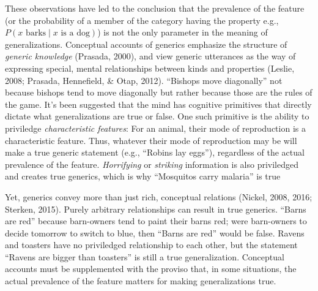 \documentclass[english,floatsintext,man]{apa6}
\theoremstyle{definition}
\theoremstyle{definition}
\theoremstyle{definition}
\theoremstyle{remark}
\begin{document}
These observations have led to the conclusion that the prevalence of the
feature (or the probability of a member of the category having the
property e.g., \(P(x \text{ barks} \mid x \text{ is a dog})\)) is not
the only parameter in the meaning of generalizations. Conceptual
accounts of generics emphasize the structure of \emph{generic knowledge}
(Prasada, 2000), and view generic utterances as the way of expressing
special, mental relationships between kinds and properties (Leslie,
2008; Prasada, Hennefield, \& Otap, 2012). \enquote{Bishops move
diagonally} not because bishops tend to move diagonally but rather
because those are the rules of the game. It's been suggested that the
mind has cognitive primitives that directly dictate what generalizations
are true or false. One such primitive is the ability to priviledge
\emph{characteristic features}: For an animal, their mode of
reproduction is a characteristic feature. Thus, whatever their mode of
reproduction may be will make a true generic statement (e.g.,
\enquote{Robins lay eggs}), regardless of the actual prevalence of the
feature. \emph{Horrifying} or \emph{striking} information is also
priviledged and creates true generics, which is why \enquote{Mosquitos
carry malaria} is true

Yet, generics convey more than just rich, conceptual relations (Nickel,
2008, 2016; Sterken, 2015). Purely arbitrary relationships can result in
true generics. \enquote{Barns are red} because barn-owners tend to paint
their barns red; were barn-owners to decide tomorrow to switch to blue,
then \enquote{Barns are red} would be false. Ravens and toasters have no
priviledged relationship to each other, but the statement
\enquote{Ravens are bigger than toasters} is still a true
generalization. Conceptual accounts must be supplemented with the
proviso that, in some situations, the actual prevalence of the feature
matters for making generalizations true.
\end{document}
